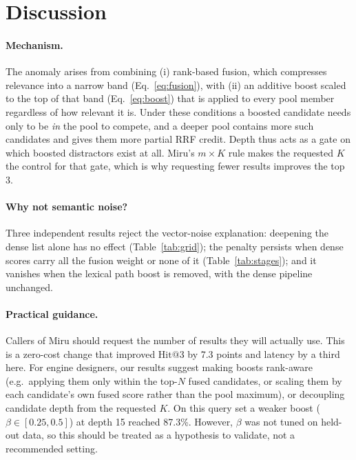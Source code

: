 \documentclass[11pt, letterpaper]{article}
\makeatletter
\newcommand{\hit}{\mathrm{Hit@3}}
\makeatother
\begin{document}
\section{Discussion}
\paragraph{Mechanism.} The anomaly arises from combining (i) rank-based fusion, which compresses relevance into a
narrow band (Eq.~\ref{eq:fusion}), with (ii) an additive boost scaled to the top of that band (Eq.~\ref{eq:boost})
that is applied to every pool member regardless of how relevant it is. Under these conditions a boosted candidate
needs only to be \emph{in} the pool to compete, and a deeper pool contains more such candidates and gives them more
partial RRF credit. Depth thus acts as a gate on which boosted distractors exist at all. Miru's $m{\times}K$ rule makes
the requested $K$ the control for that gate, which is why requesting fewer results improves the top 3.

\paragraph{Why not semantic noise?} Three independent results reject the vector-noise explanation: deepening the dense
list alone has no effect (Table~\ref{tab:grid}); the penalty persists when dense scores carry all the fusion weight or
none of it (Table~\ref{tab:stages}); and it vanishes when the lexical path boost is removed, with the dense pipeline
unchanged.

\paragraph{Practical guidance.} Callers of Miru should request the number of results they will actually use. This is a
zero-cost change that improved $\hit$ by 7.3 points and latency by a third here. For engine designers, our results
suggest making boosts rank-aware (e.g.\ applying them only within the top-$N$ fused candidates, or scaling them by each
candidate's own fused score rather than the pool maximum), or decoupling candidate depth from the requested $K$.
On this query set a weaker boost ($\beta\in[0.25, 0.5]$) at depth 15 reached 87.3\%. However, $\beta$ was not tuned on
held-out data, so this should be treated as a hypothesis to validate, not a recommended setting.

\end{document}
